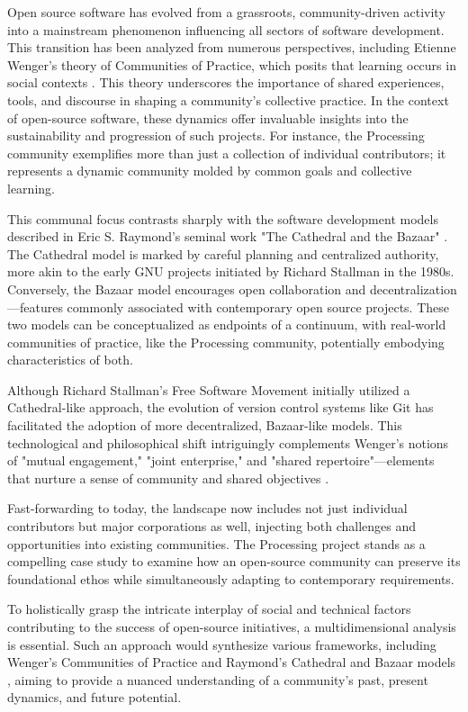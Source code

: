 Open source software has evolved from a grassroots, community-driven activity into a mainstream phenomenon influencing all sectors of software development. This transition has been analyzed from numerous perspectives, including Etienne Wenger's theory of Communities of Practice, which posits that learning occurs in social contexts \parencite{wengerCommunitiesPracticeLearning1998}. This theory underscores the importance of shared experiences, tools, and discourse in shaping a community's collective practice. In the context of open-source software, these dynamics offer invaluable insights into the sustainability and progression of such projects. For instance, the Processing community exemplifies more than just a collection of individual contributors; it represents a dynamic community molded by common goals and collective learning.

This communal focus contrasts sharply with the software development models described in Eric S. Raymond's seminal work "The Cathedral and the Bazaar" \parencite{CathedralBazaarMusings2002a}. The Cathedral model is marked by careful planning and centralized authority, more akin to the early GNU projects initiated by Richard Stallman in the 1980s. Conversely, the Bazaar model encourages open collaboration and decentralization—features commonly associated with contemporary open source projects. These two models can be conceptualized as endpoints of a continuum, with real-world communities of practice, like the Processing community, potentially embodying characteristics of both.

Although Richard Stallman's Free Software Movement initially utilized a Cathedral-like approach, the evolution of version control systems like Git has facilitated the adoption of more decentralized, Bazaar-like models. This technological and philosophical shift intriguingly complements Wenger's notions of "mutual engagement," "joint enterprise," and "shared repertoire"—elements that nurture a sense of community and shared objectives \parencite{wengerCommunitiesPracticeLearning1998}.

Fast-forwarding to today, the landscape now includes not just individual contributors but major corporations as well, injecting both challenges and opportunities into existing communities. The Processing project stands as a compelling case study to examine how an open-source community can preserve its foundational ethos while simultaneously adapting to contemporary requirements.

To holistically grasp the intricate interplay of social and technical factors contributing to the success of open-source initiatives, a multidimensional analysis is essential. Such an approach would synthesize various frameworks, including Wenger's Communities of Practice \parencite{wengerCommunitiesPracticeLearning1998} and Raymond's Cathedral and Bazaar models \parencite{CathedralBazaarMusings2002a}, aiming to provide a nuanced understanding of a community's past, present dynamics, and future potential.





